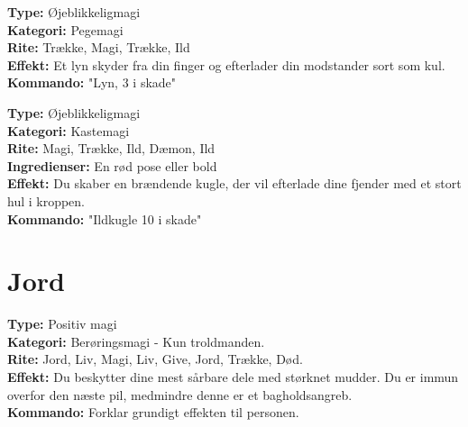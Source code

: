 \begin{ild*}[Lyn]
\textbf{Type:} Øjeblikkeligmagi\\
\textbf{Kategori:} Pegemagi\\
\textbf{Rite:} Trække, Magi, Trække, Ild\\
\textbf{Effekt:} Et lyn skyder fra din finger og efterlader din modstander sort som kul.\\
\textbf{Kommando:} "Lyn, 3 i skade"
\end{ild*}


\begin{ild*}[Ildkugle]
\textbf{Type:} Øjeblikkeligmagi\\
\textbf{Kategori:} Kastemagi\\
\textbf{Rite:} Magi, Trække, Ild, Dæmon, Ild\\
\textbf{Ingredienser:} En rød pose eller bold\\
\textbf{Effekt:} Du skaber en brændende kugle, der vil efterlade dine fjender med et stort hul i kroppen.\\
\textbf{Kommando:} "Ildkugle 10 i skade"
\end{ild*}

\section{Jord}
\begin{jord*}
\textbf{Type:} Positiv magi\\
\textbf{Kategori:} Berøringsmagi - Kun troldmanden.\\
\textbf{Rite:} Jord, Liv, Magi, Liv, Give, Jord, Trække, Død. \\
\textbf{Effekt:} Du beskytter dine mest sårbare dele med størknet mudder. Du er immun overfor den næste pil, medmindre denne er et bagholdsangreb.\\
\textbf{Kommando:} Forklar grundigt effekten til personen.
\end{jord*}

